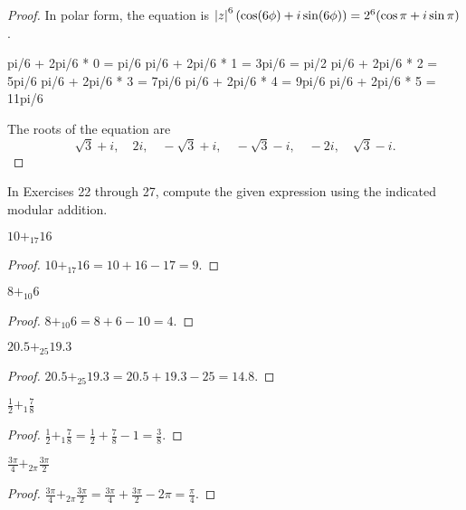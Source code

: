 \begin{proof}
    In polar form, the equation is $\left\vert{z}\right\vert^{6}(\cos(6\phi) + i\sin(6\phi)) = 2^{6}(\cos\pi + i\sin\pi)$.

    pi/6 + 2pi/6 * 0 = pi/6
    pi/6 + 2pi/6 * 1 = 3pi/6 = pi/2
    pi/6 + 2pi/6 * 2 = 5pi/6
    pi/6 + 2pi/6 * 3 = 7pi/6
    pi/6 + 2pi/6 * 4 = 9pi/6
    pi/6 + 2pi/6 * 5 = 11pi/6

    The roots of the equation are
    \[
        \sqrt{3} + i,\quad 2i,\quad -\sqrt{3} + i,\quad -\sqrt{3} - i,\quad -2i,\quad \sqrt{3} - i.
    \]
\end{proof}

In Exercises 22 through 27, compute the given expression using the indicated modular addition.

\begin{exercise}
    $10 {+}_{17} 16$
\end{exercise}

\begin{proof}
    $10 {+}_{17} 16 = 10 + 16 - 17 = 9$.
\end{proof}

\begin{exercise}
    $8 {+}_{10} 6$
\end{exercise}

\begin{proof}
    $8 {+}_{10} 6 = 8 + 6 - 10 = 4$.
\end{proof}

\begin{exercise}
    $20.5 {+}_{25} 19.3$
\end{exercise}

\begin{proof}
    $20.5 {+}_{25} 19.3 = 20.5 + 19.3 - 25 = 14.8$.
\end{proof}

\begin{exercise}
    $\frac{1}{2} {+}_{1} \frac{7}{8}$
\end{exercise}

\begin{proof}
    $\frac{1}{2} {+}_{1} \frac{7}{8} = \frac{1}{2} + \frac{7}{8} - 1 = \frac{3}{8}$.
\end{proof}

\begin{exercise}
    $\frac{3\pi}{4} {+}_{2\pi} \frac{3\pi}{2}$
\end{exercise}

\begin{proof}
    $\frac{3\pi}{4} {+}_{2\pi} \frac{3\pi}{2} = \frac{3\pi}{4} + \frac{3\pi}{2} - 2\pi = \frac{\pi}{4}$.
\end{proof}


